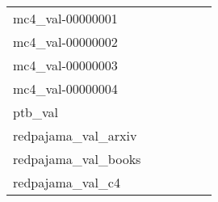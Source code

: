 {\begin{longtable}{m{6cm}m{1.7cm}m{1.7cm}m{1.7cm}m{1.7cm}m{1.7cm}}
	mc4\_val-00000001  & \colorbox[HTML]{f8fcc2}{\makebox[\mywidth][c]{12.17}} & \colorbox[HTML]{e5f5ac}{\makebox[\mywidth][c]{11.97}} & \colorbox[HTML]{ffffe5}{\makebox[\mywidth][c]{13.58}} & \colorbox[HTML]{a9db8c}{\makebox[\mywidth][c]{11.74}} & \colorbox[HTML]{77c578}{\makebox[\mywidth][c]{11.64}}\\
	mc4\_val-00000002  & \colorbox[HTML]{d8efa2}{\makebox[\mywidth][c]{9.96}} & \colorbox[HTML]{e6f5ad}{\makebox[\mywidth][c]{10.06}} & \colorbox[HTML]{ffffe5}{\makebox[\mywidth][c]{11.96}} & \colorbox[HTML]{c1e597}{\makebox[\mywidth][c]{9.86}} & \colorbox[HTML]{77c578}{\makebox[\mywidth][c]{9.67}}\\
	mc4\_val-00000003  & \colorbox[HTML]{f1f9b4}{\makebox[\mywidth][c]{11.38}} & \colorbox[HTML]{e3f4aa}{\makebox[\mywidth][c]{11.29}} & \colorbox[HTML]{ffffe5}{\makebox[\mywidth][c]{12.77}} & \colorbox[HTML]{b6e092}{\makebox[\mywidth][c]{11.12}} & \colorbox[HTML]{77c578}{\makebox[\mywidth][c]{11.00}}\\
	mc4\_val-00000004  & \colorbox[HTML]{fbfdd4}{\makebox[\mywidth][c]{11.96}} & \colorbox[HTML]{e5f5ac}{\makebox[\mywidth][c]{11.64}} & \colorbox[HTML]{ffffe5}{\makebox[\mywidth][c]{13.03}} & \colorbox[HTML]{c2e698}{\makebox[\mywidth][c]{11.50}} & \colorbox[HTML]{77c578}{\makebox[\mywidth][c]{11.35}}\\
	ptb\_val  & \colorbox[HTML]{78c679}{\makebox[\mywidth][c]{15.92}} & \colorbox[HTML]{f0f9b4}{\makebox[\mywidth][c]{16.65}} & \colorbox[HTML]{ffffe5}{\makebox[\mywidth][c]{19.37}} & \colorbox[HTML]{90d082}{\makebox[\mywidth][c]{16.00}} & \colorbox[HTML]{77c578}{\makebox[\mywidth][c]{15.92}}\\
	redpajama\_val\_arxiv  & \colorbox[HTML]{c5e799}{\makebox[\mywidth][c]{5.15}} & \colorbox[HTML]{f8fcc1}{\makebox[\mywidth][c]{5.28}} & \colorbox[HTML]{ffffe5}{\makebox[\mywidth][c]{5.78}} & \colorbox[HTML]{a5d98b}{\makebox[\mywidth][c]{5.12}} & \colorbox[HTML]{77c578}{\makebox[\mywidth][c]{5.09}}\\
	redpajama\_val\_books  & \colorbox[HTML]{fbfdd4}{\makebox[\mywidth][c]{12.91}} & \colorbox[HTML]{ebf7b0}{\makebox[\mywidth][c]{12.71}} & \colorbox[HTML]{ffffe5}{\makebox[\mywidth][c]{13.60}} & \colorbox[HTML]{cae99c}{\makebox[\mywidth][c]{12.61}} & \colorbox[HTML]{77c578}{\makebox[\mywidth][c]{12.50}}\\
	redpajama\_val\_c4  & \colorbox[HTML]{fefee3}{\makebox[\mywidth][c]{13.01}} & \colorbox[HTML]{e9f6af}{\makebox[\mywidth][c]{12.51}} & \colorbox[HTML]{ffffe5}{\makebox[\mywidth][c]{13.55}} & \colorbox[HTML]{e5f4ab}{\makebox[\mywidth][c]{12.49}} & \colorbox[HTML]{77c578}{\makebox[\mywidth][c]{12.27}}\\

\end{longtable}}
